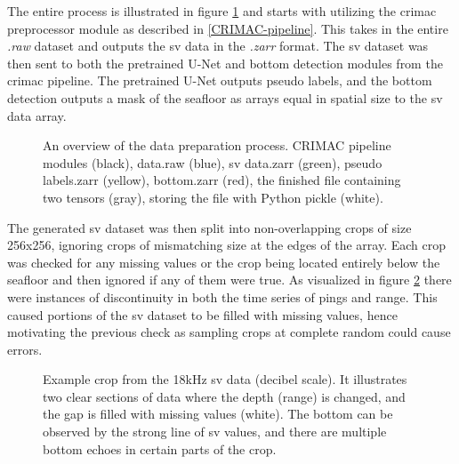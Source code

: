         The entire process is illustrated in figure \ref{data_generation_flowchart_fig} and starts with utilizing the \gls{crimac} preprocessor module as described in \ref{CRIMAC-pipeline}. This takes in the entire \textit{.raw} dataset and outputs the \gls{sv} data in the \textit{.zarr} format. The \gls{sv} dataset was then sent to both the pretrained U-Net and bottom detection modules from the \gls{crimac} pipeline. The pretrained U-Net outputs pseudo labels, and the bottom detection outputs a mask of the seafloor as arrays equal in spatial size to the \gls{sv} data array.
         \clearpage
        \begin{figure}[H]
            \centering
            
            \caption[Data preparation process]{An overview of the data preparation process. CRIMAC pipeline modules (black), data.raw (blue), \gls{sv} data.zarr (green), pseudo labels.zarr (yellow), bottom.zarr (red), the finished file containing two tensors (gray), storing the file with Python pickle (white).}
          	\medskip 
            \label{data_generation_flowchart_fig}
        \end{figure}
        The generated \gls{sv} dataset was then split into non-overlapping crops of size 256x256, ignoring crops of mismatching size at the edges of the array. Each crop was checked for any missing values or the crop being located entirely below the seafloor and then ignored if any of them were true. As visualized in figure \ref{data_bottom_nans_fig} there were instances of discontinuity in both the time series of pings and range. This caused portions of the \gls{sv} dataset to be filled with missing values, hence motivating the previous check as sampling crops at complete random could cause errors.
                \begin{figure}[H]   
            \centering
            
            \caption[Missing values and bottom]{Example crop from the 18kHz \gls{sv} data (decibel scale). It illustrates two clear sections of data where the depth (range) is changed, and the gap is filled with missing values (white). The bottom can be observed by the strong line of \gls{sv} values, and there are multiple bottom echoes in certain parts of the crop.}
          	\medskip 
            \label{data_bottom_nans_fig}
        \end{figure}
        
